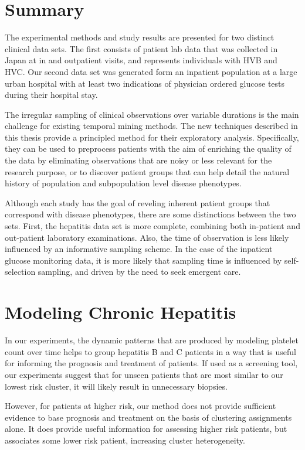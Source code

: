 \section{Summary}
The experimental methods and study results are presented for two distinct clinical data sets.  The first consists of patient lab data that was collected in Japan at in and outpatient visits, and represents individuals with HVB and HVC.  Our second data set was generated form an inpatient population at a large urban hospital with at least two indications of physician ordered glucose tests during their hospital stay.

The irregular sampling of clinical observations over variable durations is the main challenge for existing temporal mining methods.  The new techniques described in this thesis provide a principled method for their exploratory analysis.  Specifically, they can be used to preprocess patients with the aim of enriching the quality of the data by eliminating observations that are noisy or less relevant for the research purpose, or to discover patient groups that can help detail the natural history of population and subpopulation level disease phenotypes.

Although each study has the goal of reveling inherent patient groups that correspond with disease phenotypes, there are some distinctions between the two sets.  First, the hepatitis data set is more complete, combining both in-patient and out-patient laboratory examinations.  Also, the time of observation is less likely influenced by an informative sampling scheme. In the case of the inpatient glucose monitoring data, it is more likely that sampling time is influenced by self-selection sampling, and driven by the need to seek emergent care.

\section{Modeling Chronic Hepatitis}
 In our experiments, the dynamic patterns that are produced by modeling platelet count over time helps to group hepatitis B and C patients in a way that is useful for informing the prognosis and treatment of patients.  If used as a screening tool, our experiments suggest that for unseen patients that are most similar to our lowest risk cluster, it will likely result in unnecessary biopsies.

 However, for patients at higher risk, our method does not provide sufficient evidence to base prognosis and treatment on the basis of clustering assignments alone.  It does provide useful information for assessing higher risk patients, but associates some lower risk patient, increasing cluster heterogeneity.

